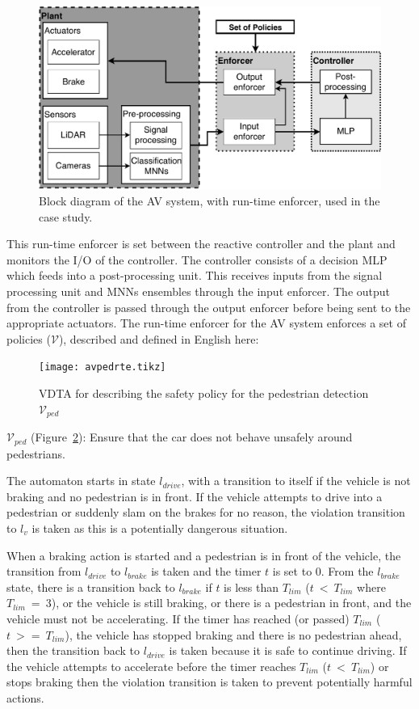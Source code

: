 \begin{figure}[h]
	\centering
	\includegraphics[scale=0.6]{Content/fig/AV-sys.pdf}
	\caption{Block diagram of the \ac{AV} system, with run-time enforcer, used in the case study. \label{fig:avenf}}
\end{figure}

This run-time enforcer is set between the reactive controller and the plant and monitors the I/O of the controller.
The controller consists of a decision \ac{MLP} which feeds into a post-processing unit.
This receives inputs from the signal processing unit and \acp{MNN} ensembles through the input enforcer.
The output from the controller is passed through the output enforcer before being sent to the appropriate actuators.
The run-time enforcer for the \ac{AV} system enforces a set of policies ($\mathcal{V}$), described and defined in English here:

\begin{figure}[h]
	\centering
	\texttt{[image: avpedrte.tikz]}
	\caption{\ac{VDTA} for describing the safety policy for the pedestrian detection $\mathcal{V}_{ped}$\label{fig:avpedrte}}
\end{figure}

$\mathcal{V}_{ped}$ (Figure~\ref{fig:avpedrte}): Ensure that the car does not behave unsafely around pedestrians. 

The automaton starts in state $l_{drive}$, with a transition to itself if the vehicle is not braking and no pedestrian is in front.
If the vehicle attempts to drive into a pedestrian or suddenly slam on the brakes for no reason, the violation transition to $l_v$ is taken as this is a potentially dangerous situation.
 
When a braking action is started and a pedestrian is in front of the vehicle, the transition from $l_{drive}$ to $l_{brake}$ is taken and the timer $t$ is set to 0.
From the $l_{brake}$ state, there is a transition back to $l_{brake}$ if $t$ is less than $T_{lim}$ ($t~<~T_{lim}$ where $T_{lim}~=~3$), or the vehicle is still braking, or there is a pedestrian in front, and the vehicle must not be accelerating.
If the timer has reached (or passed) $T_{lim}$ ($t~>=~T_{lim}$), the vehicle has stopped braking and there is no pedestrian ahead, then the transition back to $l_{drive}$ is taken because it is safe to continue driving.
If the vehicle attempts to accelerate before the timer reaches $T_{lim}$ ($t~<~T_{lim}$) or stops braking then the violation transition is taken to prevent potentially harmful actions.

